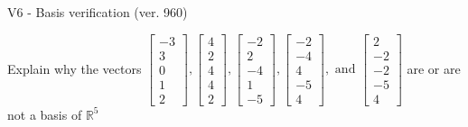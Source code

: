 \begin{exercise}
  \begin{exerciseTitle}V6 - Basis verification (ver. 960)\end{exerciseTitle}
  \begin{exerciseStatement}
    Explain why the vectors \(\left[\begin{array}{r}
-3 \\
3 \\
0 \\
1 \\
2
\end{array}\right] , \left[\begin{array}{r}
4 \\
2 \\
4 \\
4 \\
2
\end{array}\right] , \left[\begin{array}{r}
-2 \\
2 \\
-4 \\
1 \\
-5
\end{array}\right] , \left[\begin{array}{r}
-2 \\
-4 \\
4 \\
-5 \\
4
\end{array}\right] , \text{ and } \left[\begin{array}{r}
2 \\
-2 \\
-2 \\
-5 \\
4
\end{array}\right]\) are or are not a basis of \(\mathbb{R}^5\)	



\end{exerciseStatement}
\end{exercise}
